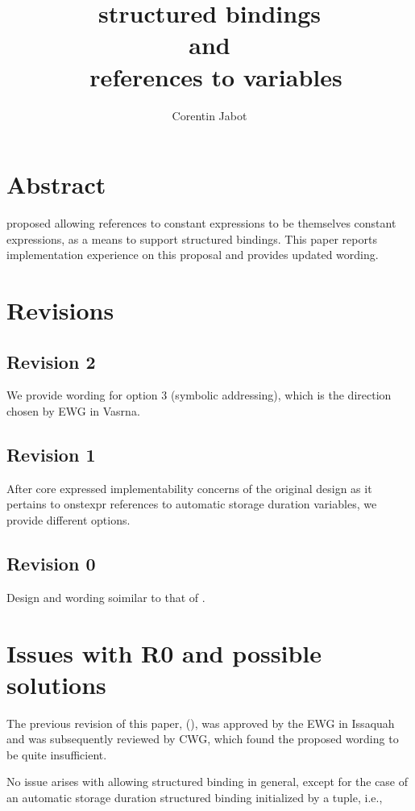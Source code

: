 \documentclass{wg21}
\title{\tcode{constexpr} structured bindings\\{\small and}\\\ references to \tcode{constexpr} variables}
\author{Corentin Jabot}{corentin.jabot@gmail.com}
\begin{document}
\maketitle

\section{Abstract}

 proposed allowing references to constant expressions to be themselves constant expressions,
as a means to support  structured bindings.
This paper reports implementation experience on this proposal and provides updated wording.


\section{Revisions}

\subsection{Revision 2}

We provide wording for option 3 (symbolic addressing), which is the direction chosen by EWG in Vasrna.

\subsection{Revision 1}

After core expressed implementability concerns of the original design as it pertains to onstexpr references to automatic storage duration variables,
we provide different options.

\subsection{Revision 0}

Design and wording soimilar to that of .

\section{Issues with R0 and possible solutions}

The previous revision of this paper, (), was approved by the EWG in Issaquah and was subsequently
reviewed by CWG, which found the proposed wording to be quite insufficient.

No issue arises with allowing  structured binding in general, except for the case of an automatic storage duration structured binding
initialized by a tuple, i.e.,
\end{document}
